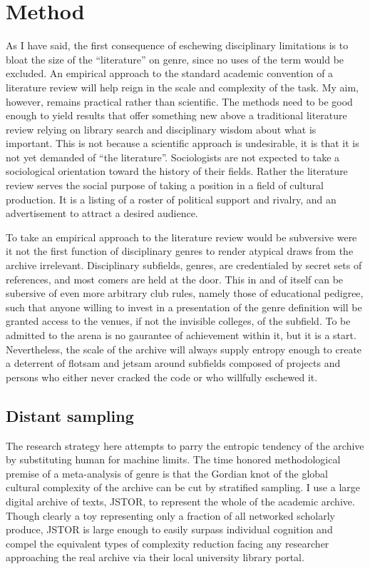 \documentclass[]{book}
\theoremstyle{definition}
\theoremstyle{definition}
\theoremstyle{definition}
\theoremstyle{remark}
\begin{document}
\hypertarget{method}{%
\section{Method}\label{method}}

As I have said, the first consequence of eschewing disciplinary
limitations is to bloat the size of the ``literature'' on genre, since
no uses of the term would be excluded. An empirical approach to the
standard academic convention of a literature review will help reign in
the scale and complexity of the task. My aim, however, remains practical
rather than scientific. The methods need to be good enough to yield
results that offer something new above a traditional literature review
relying on library search and disciplinary wisdom about what is
important. This is not because a scientific approach is undesirable, it
is that it is not yet demanded of ``the literature''. Sociologists are
not expected to take a sociological orientation toward the history of
their fields. Rather the literature review serves the social purpose of
taking a position in a field of cultural production. It is a listing of
a roster of political support and rivalry, and an advertisement to
attract a desired audience.

To take an empirical approach to the literature review would be
subversive were it not the first function of disciplinary genres to
render atypical draws from the archive irrelevant. Disciplinary
subfields, genres, are credentialed by secret sets of references, and
most comers are held at the door. This in and of itself can be subersive
of even more arbitrary club rules, namely those of educational pedigree,
such that anyone willing to invest in a presentation of the genre
definition will be granted access to the venues, if not the invisible
colleges, of the subfield. To be admitted to the arena is no gaurantee
of achievement within it, but it is a start. Nevertheless, the scale of
the archive will always supply entropy enough to create a deterrent of
flotsam and jetsam around subfields composed of projects and persons who
either never cracked the code or who willfully eschewed it.

\hypertarget{distant-sampling}{%
\subsection{Distant sampling}\label{distant-sampling}}

The research strategy here attempts to parry the entropic tendency of
the archive by substituting human for machine limits. The time honored
methodological premise of a meta-analysis of genre is that the Gordian
knot of the global cultural complexity of the archive can be cut by
stratified sampling. I use a large digital archive of texts, JSTOR, to
represent the whole of the academic archive. Though clearly a toy
representing only a fraction of all networked scholarly produce, JSTOR
is large enough to easily surpass individual cognition and compel the
equivalent types of complexity reduction facing any researcher
approaching the real archive via their local university library portal.
\end{document}
